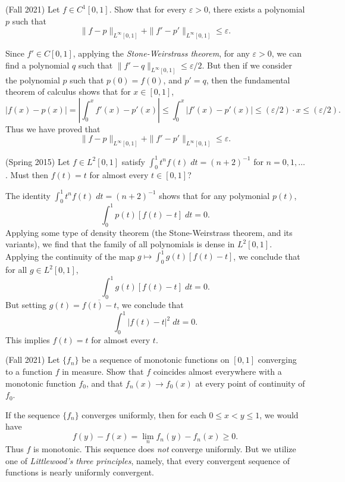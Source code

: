 \documentclass[answers]{exam}
\begin{document}
\begin{questions}
\question (Fall 2021) Let $f \in C^1[0,1]$. Show that for every $\varepsilon > 0$, there exists a polynomial $p$ such that
%
\[ \| f - p \|_{L^\infty[0,1]} + \| f' - p' \|_{L^\infty[0,1]} \leq \varepsilon. \]
\begin{solution}
	Since $f' \in C[0,1]$, applying the \emph{Stone-Weirstrass theorem}, for any $\varepsilon > 0$, we can find a polynomial $q$ such that $\| f' - q \|_{L^\infty[0,1]} \leq \varepsilon / 2$. But then if we consider the polynomial $p$ such that $p(0) = f(0)$, and $p' = q$, then the fundamental theorem of calculus shows that for $x \in [0,1]$,
	\[ |f(x) - p(x)| = \left| \int_0^x f'(x) - p'(x) \right| \leq \int_0^x |f'(x) - p'(x)| \leq (\varepsilon / 2) \cdot x \leq (\varepsilon/2). \]
	Thus we have proved that
	\[ \| f - p \|_{L^\infty[0,1]} + \| f' - p' \|_{L^\infty[0,1]} \leq \varepsilon. \]
\end{solution}

\question (Spring 2015) Let $f \in L^2[0,1]$ satisfy $\int_0^1 t^n f(t)\; dt = (n+2)^{-1}$ for $n = 0, 1,\dots$. Must then $f(t) = t$ for almost every $t \in [0,1]$?
\begin{solution}
    The identity $\int_0^1 t^n f(t)\; dt = (n+2)^{-1}$ shows that for any polymonial $p(t)$,
    \[ \int_0^1 p(t) [f(t) - t]\; dt = 0. \]
    Applying some type of density theorem (the Stone-Weirstrass theorem, and its variants), we find that the family of all polynomials is dense in $L^2[0,1]$. Applying the continuity of the map $g \mapsto \int_0^1 g(t) [f(t) - t]$, we conclude that for all $g \in L^2[0,1]$,
    \[ \int_0^1 g(t) [f(t) - t]\; dt = 0. \]
    But setting $g(t) = \overline{f(t) - t}$, we conclude that
    \[ \int_0^1 |f(t) - t|^2\; dt = 0. \]
    This implies $f(t) = t$ for almost every $t$.
\end{solution}

\question (Fall 2021) Let $\{ f_n \}$ be a sequence of monotonic functions on $[0,1]$ converging to a function $f$ in measure. Show that $f$ coincides almost everywhere with a monotonic function $f_0$, and that $f_n(x) \to f_0(x)$ at every point of continuity of $f_0$.
\begin{solution}
	If the sequence $\{ f_n \}$ converges uniformly, then for each $0 \leq x < y \leq 1$, we would have
	\[ f(y) - f(x) = \lim_n f_n(y) - f_n(x) \geq 0. \]
	Thus $f$ is monotonic. This sequence does \emph{not} converge uniformly. But we utilize one of \emph{Littlewood's three principles}, namely, that every convergent sequence of functions is nearly uniformly convergent.


\end{solution}
\end{questions}
\end{document}
